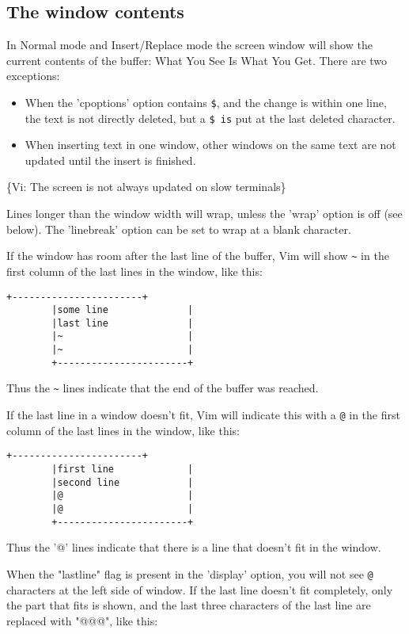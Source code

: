\subsection{The window contents}
\label{window-contents}
In Normal mode and Insert/Replace mode the screen window will show the current contents of the buffer: What You See Is What You Get.
There are two exceptions:
\begin{itemize}
				\item When the 'cpoptions' option contains \verb!$!,  and the change is within one line, the text is not directly deleted, but a \verb!$ is! put at the last deleted character.
				\item When inserting text in one window, other windows on the same text are not updated until the insert is finished.
\end{itemize}
\{Vi: The screen is not always updated on slow terminals\}

Lines longer than the window width will wrap, unless the 'wrap' option is off (see below).
The 'linebreak' option can be set to wrap at a blank character.

If the window has room after the last line of the buffer, Vim will show \verb!~! in the first column of the last lines in the window, like this:
\begin{Verbatim}[samepage=true]
		+-----------------------+
		|some line              |
		|last line              |
		|~                      |
		|~                      |
		+-----------------------+
\end{Verbatim}

Thus the \verb!~! lines indicate that the end of the buffer was reached.

If the last line in a window doesn't fit, Vim will indicate this with a \verb'@' in the first column of the last lines in the window, like this:

\begin{Verbatim}[samepage=true]
		+-----------------------+
		|first line             |
		|second line            |
		|@                      |
		|@                      |
		+-----------------------+
\end{Verbatim}

Thus the '@' lines indicate that there is a line that doesn't fit in the window.

When the "lastline" flag is present in the 'display' option, you will not see \verb'@' characters at the left side of window.
If the last line doesn't fit completely, only the part that fits is shown, and the last three characters of the last line are replaced with "@@@", like this:


